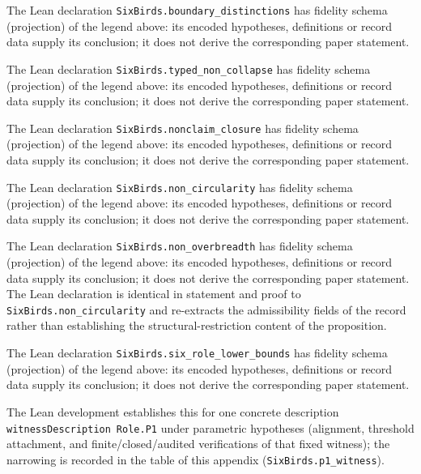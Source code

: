\documentclass[11pt]{article}
\theoremstyle{definition}
\begin{document}
\begin{description}[style=unboxed,leftmargin=0pt,itemsep=3pt]
  \item[Proposition~\ref{prop:boundary-distinctions}.] The Lean declaration \texttt{SixBirds.boundary\_distinctions} has fidelity schema (projection) of the legend above: its encoded hypotheses, definitions or record data supply its conclusion; it does not derive the corresponding paper statement.
  \item[Proposition~\ref{prop:typed-non-collapse}.] The Lean declaration \texttt{SixBirds.typed\_non\_collapse} has fidelity schema (projection) of the legend above: its encoded hypotheses, definitions or record data supply its conclusion; it does not derive the corresponding paper statement.
  \item[Proposition~\ref{prop:nonclaim-closure}.] The Lean declaration \texttt{SixBirds.nonclaim\_closure} has fidelity schema (projection) of the legend above: its encoded hypotheses, definitions or record data supply its conclusion; it does not derive the corresponding paper statement.
  \item[Proposition~\ref{prop:non-circularity}.] The Lean declaration \texttt{SixBirds.non\_circularity} has fidelity schema (projection) of the legend above: its encoded hypotheses, definitions or record data supply its conclusion; it does not derive the corresponding paper statement.
  \item[Proposition~\ref{prop:non-overbreadth}.] The Lean declaration \texttt{SixBirds.non\_overbreadth} has fidelity schema (projection) of the legend above: its encoded hypotheses, definitions or record data supply its conclusion; it does not derive the corresponding paper statement. The Lean declaration is identical in statement and proof to \texttt{SixBirds.non\_circularity} and re-extracts the admissibility fields of the record rather than establishing the structural-restriction content of the proposition.
  \item[Theorem~\ref{thm:six-role-lower-bounds}.] The Lean declaration \texttt{SixBirds.six\_role\_lower\_bounds} has fidelity schema (projection) of the legend above: its encoded hypotheses, definitions or record data supply its conclusion; it does not derive the corresponding paper statement.
  \item[Proposition~\ref{prop:p1-witness}.] The Lean development establishes this for one concrete description \texttt{witnessDescription}\allowbreak\ \texttt{Role.P1} under parametric hypotheses (alignment, threshold attachment, and finite/\allowbreak closed/\allowbreak audited verifications of that fixed witness); the narrowing is recorded in the table of this appendix (\texttt{SixBirds.p1\_witness}).

\end{description}
\end{document}
